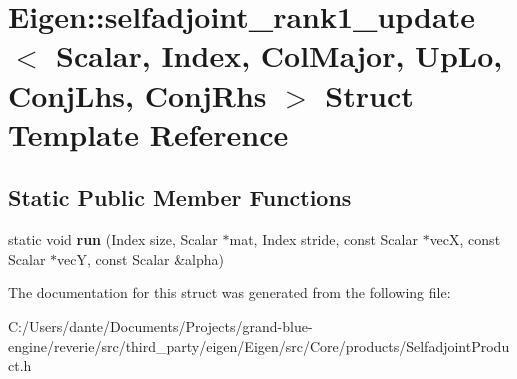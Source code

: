 \hypertarget{struct_eigen_1_1selfadjoint__rank1__update_3_01_scalar_00_01_index_00_01_col_major_00_01_up_lo_0985162e7429113fdcd7a3950b8d00f1e}{}\section{Eigen\+::selfadjoint\+\_\+rank1\+\_\+update$<$ Scalar, Index, Col\+Major, Up\+Lo, Conj\+Lhs, Conj\+Rhs $>$ Struct Template Reference}
\label{struct_eigen_1_1selfadjoint__rank1__update_3_01_scalar_00_01_index_00_01_col_major_00_01_up_lo_0985162e7429113fdcd7a3950b8d00f1e}
\subsection*{Static Public Member Functions}
\begin{DoxyCompactItemize}
\item 
\mbox{\label{struct_eigen_1_1selfadjoint__rank1__update_3_01_scalar_00_01_index_00_01_col_major_00_01_up_lo_0985162e7429113fdcd7a3950b8d00f1e_a2ff1df182b583b1d70d12885ce11b484}} 
static void {\bfseries run} (Index size, Scalar $\ast$mat, Index stride, const Scalar $\ast$vecX, const Scalar $\ast$vecY, const Scalar \&alpha)
\end{DoxyCompactItemize}


The documentation for this struct was generated from the following file\+:\begin{DoxyCompactItemize}
\item 
C\+:/\+Users/dante/\+Documents/\+Projects/grand-\/blue-\/engine/reverie/src/third\+\_\+party/eigen/\+Eigen/src/\+Core/products/Selfadjoint\+Product.\+h\end{DoxyCompactItemize}
